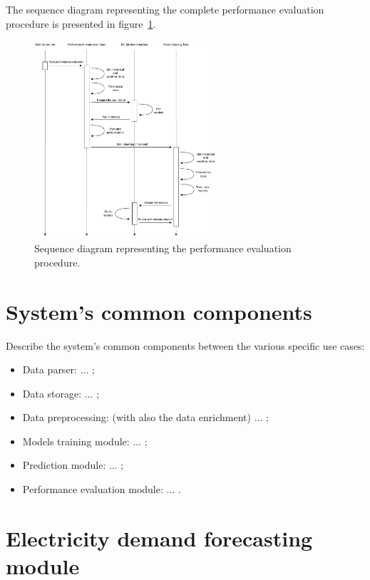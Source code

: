 The sequence diagram representing the complete performance evaluation procedure is presented in figure~\ref{fig:schedulersequence}.

\begin{figure}[H]
\centering
\includegraphics[width=0.6\textwidth]{images/architecture_scheduler_sequence}
\caption{Sequence diagram representing the performance evaluation procedure.}
\label{fig:schedulersequence}
\end{figure}


\section{System's common components}
\label{sec:components}
\vspace{0.2 cm}

Describe the system's common components between the various specific use cases:
\begin{itemize}
  \item Data parser: ... ;
  \item Data storage: ... ;
  \item Data preprocessing: (with also the data enrichment) ... ;
  \item Models training module: ... ;
  \item Prediction module: ... ;
  \item Performance evaluation module: ... .
\end{itemize}


\section{Electricity demand forecasting module}
\label{sec:demandmodel}
\vspace{0.2 cm}

